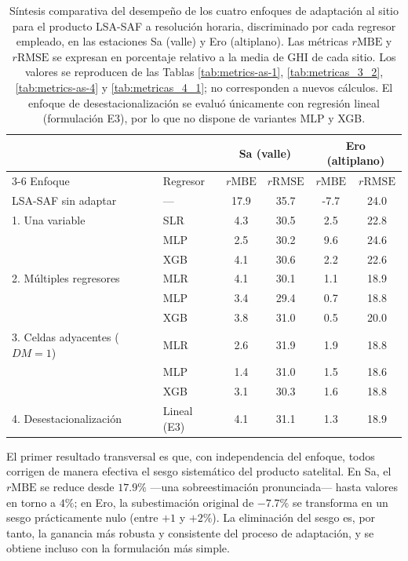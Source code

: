 \begin{table}[ht]
\centering
\caption[Síntesis del desempeño de los cuatro enfoques de adaptación.]{Síntesis comparativa del desempeño de los cuatro enfoques de adaptación al sitio para el producto \mbox{LSA-SAF} a resolución horaria, discriminado por cada regresor empleado, en las estaciones Sa (valle) y Ero (altiplano). Las métricas $r\mathrm{MBE}$ y $r\mathrm{RMSE}$ se expresan en porcentaje relativo a la media de GHI de cada sitio. Los valores se reproducen de las Tablas \ref{tab:metrics-as-1}, \ref{tab:metricas_3_2}, \ref{tab:metrics-as-4} y \ref{tab:metricas_4_1}; no corresponden a nuevos cálculos. El enfoque de desestacionalización se evaluó únicamente con regresión lineal (formulación E3), por lo que no dispone de variantes MLP y XGB.}
\label{tab:sintesis-enfoques}
\begin{tabular}{llcccc}
\hline
 & & \multicolumn{2}{c}{\textbf{Sa} (valle)} & \multicolumn{2}{c}{\textbf{Ero} (altiplano)} \\
\cline{3-6}
Enfoque & Regresor & $r\mathrm{MBE}$ & $r\mathrm{RMSE}$ & $r\mathrm{MBE}$ & $r\mathrm{RMSE}$ \\
\hline
LSA-SAF sin adaptar & ---       & 17.9 & 35.7 & -7.7 & 24.0 \\
\hline
1. Una variable          & SLR & 4.3 & 30.5 & 2.5 & 22.8 \\
                         & MLP & 2.5 & 30.2 & 9.6 & 24.6 \\
                         & XGB & 4.1 & 30.6 & 2.2 & 22.6 \\
\hline
2. Múltiples regresores  & MLR & 4.1 & 30.1 & 1.1 & 18.9 \\
                         & MLP & 3.4 & 29.4 & 0.7 & 18.8 \\
                         & XGB & 3.8 & 31.0 & 0.5 & 20.0 \\
\hline
3. Celdas adyacentes ($DM=1$) & MLR & 2.6 & 31.9 & 1.9 & 18.8 \\
                         & MLP & 1.4 & 31.0 & 1.5 & 18.6 \\
                         & XGB & 3.1 & 30.3 & 1.6 & 18.8 \\
\hline
4. Desestacionalización  & Lineal (E3) & 4.1 & 31.1 & 1.3 & 18.9 \\
\hline
\end{tabular}
\end{table}


El primer resultado transversal es que, con independencia del enfoque, todos corrigen de manera efectiva el sesgo sistemático del producto satelital. En Sa, el $r\mathrm{MBE}$ se reduce desde $17.9\%$ —una sobreestimación pronunciada— hasta valores en torno a $4\%$; en Ero, la subestimación original de $-7.7\%$ se transforma en un sesgo prácticamente nulo (entre $+1$ y $+2\%$). La eliminación del sesgo es, por tanto, la ganancia más robusta y consistente del proceso de adaptación, y se obtiene incluso con la formulación más simple.


